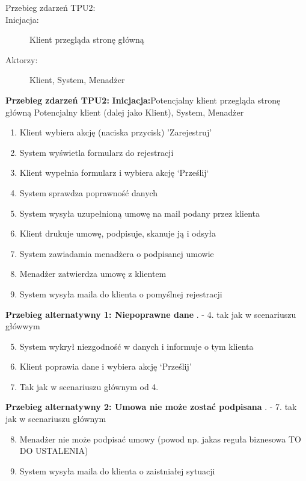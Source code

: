 \documentclass[10pt,a4paper,titlepage]{article} %
\begin{document}
		\begin{description}
			\item[Przebieg zdarzeń TPU2:]
			\item[Inicjacja:] Klient przegląda stronę główną 
			\item[Aktorzy:]  Klient, System, Menadżer
		\end{description}
		
		{\bf Przebieg zdarzeń TPU2:}\newline
		{\bf Inicjacja:}Potencjalny klient przegląda stronę główną
		Potencjalny klient (dalej jako Klient), System,
		Menadżer
			\begin{enumerate}
			  \item Klient wybiera akcję (naciska przycisk) 'Zarejestruj'
			  \item System wyświetla formularz do rejestracji
			  \item Klient wypełnia formularz i wybiera akcję `Prześlij`
			  \item System sprawdza poprawność danych
			  \item System wysyła uzupełnioną umowę na mail podany przez klienta
			  \item Klient drukuje umowę, podpisuje, skanuje ją i odsyła
			  \item System zawiadamia menadżera o podpisanej umowie
			  \item Menadżer zatwierdza umowę z klientem
			  \item System wysyła maila do klienta o pomyślnej rejestracji
			\end{enumerate}
			
			
		
		{\bf Przebieg alternatywny 1: Niepoprawne dane} . - 4. tak jak w scenariuszu główwym
			\begin{enumerate}
			  \setcounter{enumi}{4}
			  \item System wykrył niezgodność w danych i informuje o tym klienta
			  \item Klient poprawia dane i wybiera akcję `Prześlij'
			  \item Tak jak w scenariuszu głównym od 4.
			\end{enumerate}
			
	   {\bf Przebieg alternatywny 2: Umowa nie może zostać podpisana} . - 7. tak jak w scenariuszu głównym
			\begin{enumerate}
			  \setcounter{enumi}{7}
			  \item Menadżer nie może podpisać umowy (powod np. jakas reguła biznesowa
			  TO DO USTALENIA)
			  \item System wysyła maila do klienta o zaistniałej sytuacji
			\end{enumerate}
			
\end{document}
